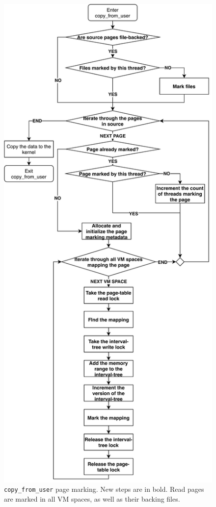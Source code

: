 \documentclass[conference]{IEEEtran}
\begin{document}
\begin{figure}[]
  \centering
  \includegraphics[width = 0.8\linewidth]{img/copy_from_user.pdf}
  \caption{\texttt{copy\_from\_user} page marking. New steps are in bold. Read pages are marked in all VM spaces, as well as their backing files.
}
  \label{fig:copyfromuser}
\end{figure}
\end{document}
